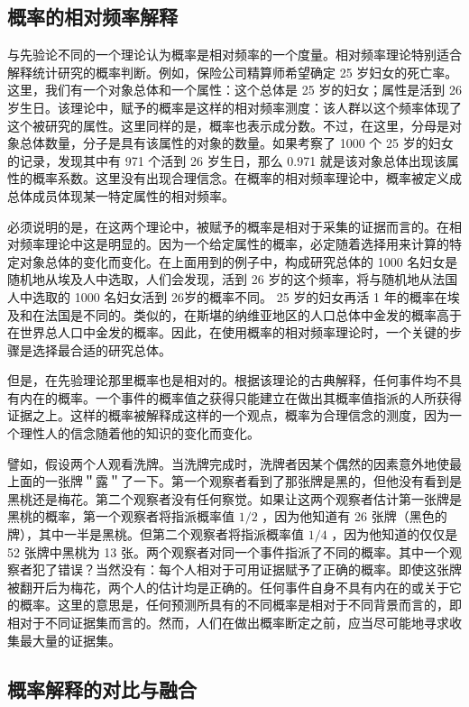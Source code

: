 \subsection{概率的相对频率解释}

与先验论不同的一个理论认为概率是相对频率的一个度量。相对频率理论特别适合解释统计研究的概率判断。例如，保险公司精算师希望确定 25 岁妇女的死亡率。这里，我们有一个对象总体和一个属性：这个总体是 25 岁的妇女；属性是活到 26 岁生日。该理论中，赋予的概率是这样的相对频率测度：该人群以这个频率体现了这个被研究的属性。这里同样的是，概率也表示成分数。不过，在这里，分母是对象总体数量，分子是具有该属性的对象的数量。如果考察了 1000 个 25 岁的妇女的记录，发现其中有 971 个活到 26 岁生日，那么 0.971 就是该对象总体出现该属性的概率系数。这里没有出现合理信念。在概率的相对频率理论中，概率被定义成总体成员体现某一特定属性的相对频率。

必须说明的是，在这两个理论中，被赋予的概率是相对于采集的证据而言的。在相对频率理论中这是明显的。因为一个给定属性的概率，必定随着选择用来计算的特定对象总体的变化而变化。在上面用到的例子中，构成研究总体的 1000 名妇女是随机地从埃及人中选取，人们会发现，活到 26 岁的这个频率，将与随机地从法国人中选取的 1000 名妇女活到 26岁的概率不同。 25 岁的妇女再活 1 年的概率在埃及和在法国是不同的。类似的，在斯堪的纳维亚地区的人口总体中金发的概率高于在世界总人口中金发的概率。因此，在使用概率的相对频率理论时，一个关键的步骤是选择最合适的研究总体。

但是，在先验理论那里概率也是相对的。根据该理论的古典解释，任何事件均不具有内在的概率。一个事件的概率值之获得只能建立在做出其概率值指派的人所获得证据之上。这样的概率被解释成这样的一个观点，概率为合理信念的测度，因为一个理性人的信念随着他的知识的变化而变化。

譬如，假设两个人观看洗牌。当洗牌完成时，洗牌者因某个偶然的因素意外地使最上面的一张牌＂露＂了一下。第一个观察者看到了那张牌是黑的，但他没有看到是黑桃还是梅花。第二个观察者没有任何察觉。如果让这两个观察者估计第一张牌是黑桃的概率，第一个观察者将指派概率值 $1 / 2$ ，因为他知道有 26 张牌（黑色的牌），其中一半是黑桃。但第二个观察者将指派概率值 $1 / 4$ ，因为他知道的仅仅是 52 张牌中黑桃为 13 张。两个观察者对同一个事件指派了不同的概率。其中一个观察者犯了错误？当然没有：每个人相对于可用证据赋予了正确的概率。即使这张牌被翻开后为梅花，两个人的估计均是正确的。任何事件自身不具有内在的或关于它的概率。这里的意思是，任何预测所具有的不同概率是相对于不同背景而言的，即相对于不同证据集而言的。然而，人们在做出概率断定之前，应当尽可能地寻求收集最大量的证据集。

\subsection{概率解释的对比与融合}

